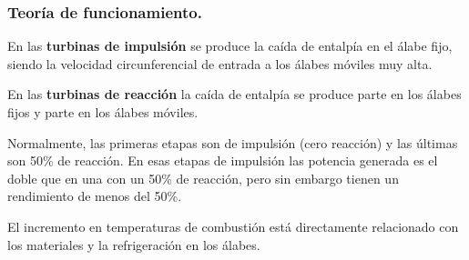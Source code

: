 			\subsubsection{Teoría de funcionamiento.}
				En las \textbf{turbinas de impulsión} se produce la caída de entalpía en el álabe fijo, siendo la velocidad circunferencial de entrada a los álabes móviles muy alta. 
				
				
				En las \textbf{turbinas de reacción} la caída de entalpía se produce parte en los álabes fijos y parte en los álabes móviles.
				
				
				Normalmente, las primeras etapas son de impulsión (cero reacción) y las últimas son 50\% de reacción. En esas etapas de impulsión las potencia generada es el doble que en una con un 50\% de reacción, pero sin embargo tienen un rendimiento de menos del 50\%.
				
				
				El incremento en temperaturas de combustión está directamente relacionado con los materiales y la refrigeración en los álabes.
	
